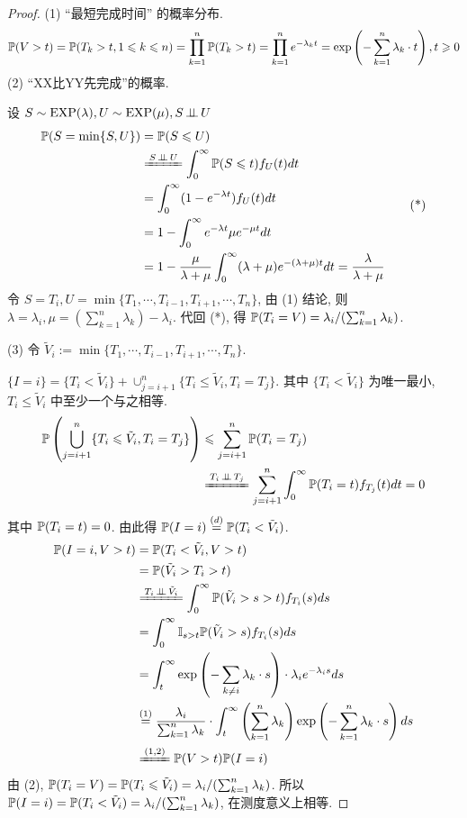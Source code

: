 \begin{proof}
(1) ``最短完成时间'' 的概率分布.
\[
\displaystyle\mathbb{P}(V>t)=\mathbb{P}(T_k>t,1\leqslant k\leqslant n)=\prod_{k=1}^n\mathbb{P}(T_k>t)=\prod_{k=1}^n e^{-\lambda_k t}=\exp \left(-\sum_{k=1}^n\lambda_k\cdot t\right), t\geqslant 0
\]
(2) ``XX比YY先完成''的概率.

设 $S\sim\operatorname{EXP}(\lambda), U\sim\operatorname{EXP}(\mu), S\operatorname{\perp\!\!\!\perp} U$
\[
\begin{aligned}
    \PP(S=\min\{S,U\}) &=\PP(S\leq U)\\
    &\xlongequal{S\ind U}\int_0^{\infty}\PP(S\leq t)f_U(t)dt\\
    &=\int_0^{\infty}(1-e^{-\lambda t})f_U(t)dt\\
    &=1-\int_0^{\infty}e^{-\lambda t}\mu e^{-\mu t}dt\\
    &=1-\frac{\mu}{\lambda+\mu}\int_0^{\infty}(\lambda+\mu)e^{-(\lambda+\mu)t}dt=\frac{\lambda}{\lambda+\mu}
\end{aligned}
\tag{*}
\]
令 $S=T_i, U=\min\{T_1,\cdots,T_{i-1},T_{i+1},\cdots,T_n\}$, 由 (1) 结论, 则 $\lambda=\lambda_i,\mu=(\sum_{k=1}^n\lambda_k)-\lambda_i$. 代回 (*), 得 $\mathbb{P}(T_i=V)=\lambda_i/(\sum_{k=1}^n\lambda_k)$.

(3) 令 $\tilde{V}_i:=\min\{T_1,\cdots,T_{i-1},T_{i+1},\cdots,T_n\}$.

$\{I=i\}=\{T_i<\tilde{V}_i\}+\cup_{j=i+1}^n\{T_i\leq \tilde{V}_i,T_i=T_j\}$. 其中 $\{T_i<\tilde{V}_i\}$ 为唯一最小, $T_i\leq \tilde{V}_i$ 中至少一个与之相等.
\[
\begin{aligned}
    \PP\left(\bigcup_{j=i+1}^n\{T_i\leq \tilde{V}_i, T_i=T_j\}\right) & \leq \sum_{j=i+1}^n\PP(T_i=T_j)\\
    &\xlongequal{T_i\ind T_j}\sum_{j=i+1}^n \int_0^{\infty}\PP(T_i=t)f_{T_j}(t)dt=0
\end{aligned}
\]
其中 $\mathbb{P}(T_i=t)=0$. 由此得 $\mathbb{P}(I=i)\overset{(d)}{=}\mathbb{P}(T_i<\tilde{V}_i)$.
\[
\begin{aligned}
    \PP(I=i,V>t)&=\PP(T_i<\tilde{V}_i,V>t)\\
    &=\PP(\tilde{V}_i>T_i>t)\\
    &\xlongequal{T_i\ind \tilde{V}_i}\int_0^{\infty}\PP(\tilde{V}_i>s>t)f_{T_i}(s)ds\\
    &=\int_0^{\infty}\II_{s>t}\PP(\tilde{V}_i>s)f_{T_i}(s)ds\\
    &=\int_t^{\infty}\exp\left(-\sum_{k\neq i}\lambda_k\cdot s\right)\cdot\lambda_i e^{-\lambda_i s}ds\\
    &\overset{(1)}{=}\frac{\lambda_i}{\sum_{k=1}^n \lambda_k}\cdot\int_t^{\infty}\left(\sum_{k=1}^n\lambda_k\right)\exp\left(-\sum_{k=1}^n\lambda_k\cdot s\right)ds\\
    &\xlongequal{(1,2)}\PP(V>t)\PP(I=i)
\end{aligned}
\]
由 (2), $\mathbb{P}(T_i=V)=\mathbb{P}(T_i\leqslant \tilde{V}_i)=\lambda_i/(\sum_{k=1}^n \lambda_k)$. 所以 $\mathbb{P}(I=i)=\mathbb{P}(T_i<\tilde{V}_i)=\lambda_i/(\sum_{k=1}^n \lambda_k)$, 在测度意义上相等.
\end{proof}

